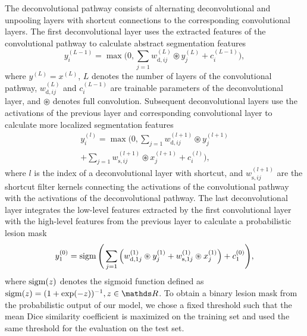 The deconvolutional pathway consists of alternating deconvolutional and
unpooling layers with shortcut connections to the corresponding
convolutional layers. The first deconvolutional layer uses the extracted
features of the convolutional pathway to calculate abstract segmentation
features
\begin{equation}
y^{(L-1)}_i = \max\Bigg(0, \sum_{j=1}w^{(L)}_{\text{d},ij}\circledast
y^{(L)}_j + c^{(L-1)}_{i}\Bigg),
\end{equation}
where $y^{(L)} = x^{(L)}$, $L$ denotes the number of layers of the convolutional
pathway, $w^{(L)}_{\text{d},ij}$ and $c^{(L-1)}_i$ are trainable parameters of
the deconvolutional layer, and $\circledast$ denotes full convolution. Subsequent
deconvolutional layers use the activations of the previous layer
and corresponding convolutional layer to calculate more localized segmentation
features
\begin{multline}
y^{(l)}_i = \max\Bigg(0, 
\sum_{j=1}w^{(l+1)}_{\text{d},ij}\circledast y^{(l+1)}_j\\
+ \sum_{j=1} w^{(l+1)}_{\text{s},ij}\circledast x^{(l+1)}_j +
c^{(l)}_i\Bigg),
\end{multline}
where $l$ is the index of a deconvolutional layer with shortcut, and
$w^{(l+1)}_{\text{s},ij}$ are the shortcut filter kernels connecting the
activations of the convolutional pathway with the activations of the
deconvolutional pathway. The last deconvolutional layer integrates the low-level
features extracted by the first convolutional layer with the high-level features
from the previous layer to calculate a probabilistic lesion mask
\begin{equation}
y^{(0)}_1 = \operatorname{sigm}\Bigg(\sum_{j=1}\Big(w^{(1)}_{\text{d},1j}\circledast
y^{(1)}_j +
w^{(1)}_{\text{s},1j}\circledast x^{(1)}_j\Big) + c^{(0)}_1\Bigg),
\end{equation}
where $\operatorname{sigm}(z)$ denotes the sigmoid function defined as $\sigm(z) = (1 +
\exp(-z))^{-1}, z \in \R$. To obtain a binary lesion mask from the probabilistic
output of our model, we chose a fixed threshold such that the mean Dice
similarity coefficient \cite{dice1945measures} is maximized on the training set
and used the same threshold for the evaluation on the test set.

